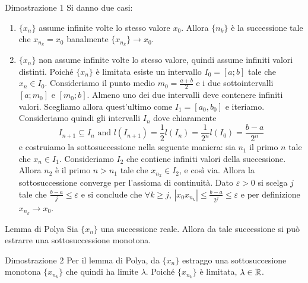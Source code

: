 \documentclass[a4paper]{article}
\begin{document}
\begin{snippetproof}{Dimostrazione 1}
    Si danno due casi:
    \begin{enumerate}
        \item \(\{x_n\}\) assume infinite volte lo stesso valore \(x_0\).
            Allora \(\{n_k\}\) è la successione tale che \(x_{n_k} = x_0\) banalmente
            \(\{x_{n_k}\} \to x_0\).
        \item \(\{x_n\}\) non assume infinite volte lo stesso valore, quindi assume infiniti valori distinti.
            Poiché \(\{x_n\}\) è limitata esiste un intervallo \(I_0 = [a;b]\)
            tale che \(x_n \in I_0\). Consideriamo il punto medio \(m_0 = \frac{a+b}{2}\)
            e  i due sottointervalli \([a; m_0]\) e \([m_0; b]\).
            Almeno uno dei due intervalli deve contenere infiniti valori.
            Scegliamo allora quest'ultimo come \(I_1 = [a_0, b_0]\) e iteriamo.
            Consideriamo quindi gli intervalli \(I_n\) dove chiaramente
            \[I_{n+1} \subseteq I_n \text{ and } l(I_{n+1}) = \frac{1}{2} l(I_n) = \frac{1}{2^n}l(I_0) = \frac{b-a}{2^n}\]
            e costruiamo la sottosuccessione nella seguente maniera: sia \(n_1\)
            il primo \(n\) tale che \(x_n \in I_1\). Consideriamo \(I_2\) che contiene infiniti
            valori della successione. Allora \(n_2\) è il primo \(n>n_1\) tale che \(x_{n_2} \in I_2\),
            e così via.
            Allora la sottosuccessione converge per l'assioma di continuità.
            Dato \(\varepsilon > 0\) si scelga \(j\) tale che \(\frac{b-a}{j} \leq \varepsilon\)
            e si conclude che \(\forall k \geq j\), \(|x_0 x_{n_k}| \leq \frac{b-a}{2^j} \leq \varepsilon\)
            e per definizione \(x_{n_k} \to x_0\).
    \end{enumerate}
\end{snippetproof}

\begin{snippetlemma}{Lemma di Polya}
    Sia \(\{x_n\}\) una successione reale. Allora da tale successione si può estrarre
    una sottosuccessione monotona.
\end{snippetlemma}

\begin{snippetproof}{Dimostrazione 2}
    Per il lemma di Polya, da \(\{x_n\}\) estraggo una sottosuccesione monotona \(\{x_{n_k}\}\) che quindi
    ha limite \(\lambda\). Poiché \(\{x_{n_k}\}\) è limitata, \(\lambda \in \mathbb{R}\).
\end{snippetproof}
\end{document}
